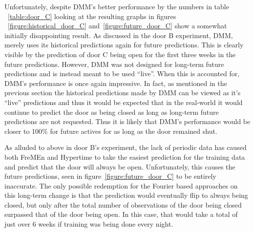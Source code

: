 Unfortunately, despite DMM's better performance by the numbers in table
~\ref{table:door_C}
looking at the resulting graphs in figures
~\ref{figure:historical_door_C} and~\ref{figure:future_door_C}
show a somewhat
initially disappointing result. As discussed in the door B experiment,
DMM, merely uses its historical predictions again for future
predictions. This is clearly visible by the prediction of door C being open
for the first three weeks in the future predictions. However, DMM was not
designed for long-term future predictions and is instead meant to be used
``live''. When this is accounted for, DMM's performance is once again
impressive. In fact, as mentioned in the previous section the
historical predictions made by DMM can be viewed as it's ``live''
predictions and thus it would be expected that in the real-world it would
continue to predict the door as being closed as long as long-term future
predictions are not requested. Thus it is likely that DMM's
performance would be closer to 100\% for future actives for as long as the door
remained shut. \\

\begin{table}[h!]
  \centering
  \caption{Door C Data Overview}
  \label{table:door_C}
\end{table}

As alluded to above in door B's experiment, the lack of periodic data has
caused both FreMEn and Hypertime to take the easiest prediction for the
training data and predict that the door will always be open. Unfortunately,
this causes the future predictions, seen in figure~\ref{figure:future_door_C} to be entirely inaccurate. The only possible redemption
for the Fourier based approaches on this long-term change is that the
prediction would eventually flip to always being closed, but only after the total number of observations of the door being
closed surpassed that of the door being open. In this case, that would take a
total of just over 6 weeks if training was being done every night. \\

